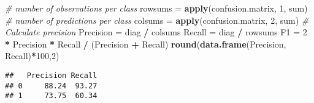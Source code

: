 \documentclass[]{article}
\newenvironment{Shaded}{\begin{snugshade}}{\end{snugshade}}
\newcommand{\KeywordTok}[1]{\textcolor[rgb]{0.13,0.29,0.53}{\textbf{#1}}}
\newcommand{\DecValTok}[1]{\textcolor[rgb]{0.00,0.00,0.81}{#1}}
\newcommand{\StringTok}[1]{\textcolor[rgb]{0.31,0.60,0.02}{#1}}
\newcommand{\CommentTok}[1]{\textcolor[rgb]{0.56,0.35,0.01}{\textit{#1}}}
\newcommand{\OperatorTok}[1]{\textcolor[rgb]{0.81,0.36,0.00}{\textbf{#1}}}
\newcommand{\NormalTok}[1]{#1}
\begin{document}
\begin{Shaded}
\begin{Highlighting}[]
\CommentTok{# number of observations per class}
\NormalTok{rowsums =}\StringTok{ }\KeywordTok{apply}\NormalTok{(confusion.matrix, }\DecValTok{1}\NormalTok{, sum)}
\CommentTok{# number of predictions per class}
\NormalTok{colsums =}\StringTok{ }\KeywordTok{apply}\NormalTok{(confusion.matrix, }\DecValTok{2}\NormalTok{, sum)}
\CommentTok{# Calculate precision}
\NormalTok{Precision =}\StringTok{ }\NormalTok{diag }\OperatorTok{/}\StringTok{ }\NormalTok{colsums}
\NormalTok{Recall =}\StringTok{ }\NormalTok{diag }\OperatorTok{/}\StringTok{ }\NormalTok{rowsums}
\NormalTok{F1 =}\StringTok{ }\DecValTok{2} \OperatorTok{*}\StringTok{ }\NormalTok{Precision }\OperatorTok{*}\StringTok{ }\NormalTok{Recall }\OperatorTok{/}\StringTok{ }\NormalTok{(Precision }\OperatorTok{+}\StringTok{ }\NormalTok{Recall) }
\KeywordTok{round}\NormalTok{(}\KeywordTok{data.frame}\NormalTok{(Precision, Recall)}\OperatorTok{*}\DecValTok{100}\NormalTok{,}\DecValTok{2}\NormalTok{) }
\end{Highlighting}
\end{Shaded}

\begin{verbatim}
##   Precision Recall
## 0     88.24  93.27
## 1     73.75  60.34
\end{verbatim}
\end{document}
